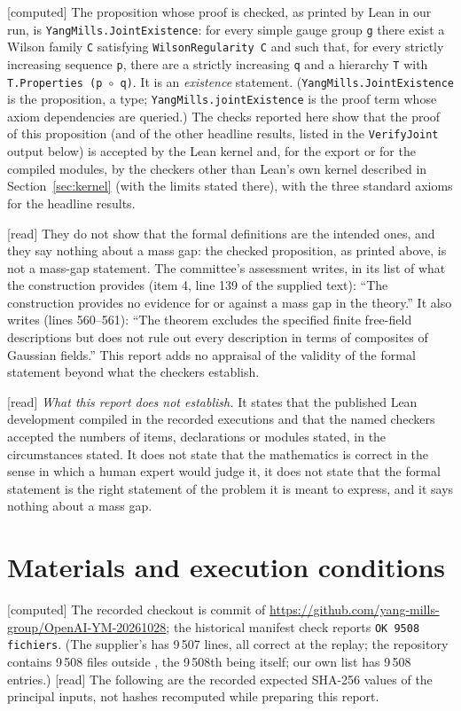 \documentclass[11pt,a4paper]{article}
\theoremstyle{plain}
\theoremstyle{definition}
\theoremstyle{remark}
\numberwithin{equation}{section}
\newcommand{\st}[1]{\textsf{[#1]}}
\begin{document}
\st{computed} The proposition whose proof is checked, as printed by Lean in our  run, is
\texttt{YangMills.JointExistence}: for every simple gauge group \texttt{g} there exist a Wilson family \texttt{C} satisfying
\texttt{WilsonRegularity C} and such that, for every strictly increasing sequence \texttt{p}, there are a strictly increasing
\texttt{q} and a hierarchy \texttt{T} with \texttt{T.Properties (p $\circ$ q)}. It is an \emph{existence} statement. (\texttt{YangMills.JointExistence} is the proposition, a type; \texttt{YangMills.jointExistence} is the proof term whose axiom dependencies are queried.) The checks
reported here show that the proof of this proposition (and of the other headline results, listed in the \texttt{VerifyJoint}
output below) is accepted by the Lean kernel and, for the export or for the compiled modules, by the checkers other than Lean's own kernel described in Section~\ref{sec:kernel} (with the limits stated there),
with the three standard axioms for the headline results.

\st{read} They do not show that the formal definitions are the intended ones, and they say nothing about a mass gap: the checked proposition, as printed above, is not a mass-gap statement. The committee's assessment writes, in its list of what the construction provides
(item 4, line 139 of the supplied text): ``The construction provides no evidence for or against a mass gap in the theory.''
It also writes (lines 560--561): ``The theorem excludes the specified finite free-field descriptions but does not rule out every
description in terms of composites of Gaussian fields.'' This report adds no appraisal of the validity of the formal statement
beyond what the checkers establish.

\st{read} \emph{What this report does not establish.} It states that the published Lean development compiled in the recorded executions and that the named checkers accepted the numbers of items, declarations or modules stated, in the circumstances stated. It does not state that the mathematics is correct in the sense in which a human expert would judge it, it does not state that the formal statement is the right statement of the problem it is meant to express, and it says nothing about a mass gap.

\section{Materials and execution conditions}

\st{computed} The recorded checkout is commit
 of
\url{https://github.com/yang-mills-group/OpenAI-YM-20261028}; the historical manifest check reports
\texttt{OK 9508 fichiers}. (The supplier's  has 9\,507 lines, all correct at the replay; the repository contains 9\,508 files outside , the 9\,508th being  itself; our own list has 9\,508 entries.)
\st{read} The following are the recorded expected SHA-256 values of the principal inputs, not hashes recomputed
while preparing this report.
\end{document}
